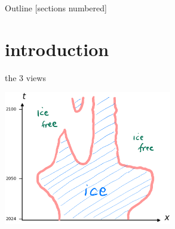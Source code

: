 \documentclass[10pt,dvipsnames]{beamer}
\begin{document}
\begin{frame}{Outline}
  [sections numbered]
  \tableofcontents[hideallsubsections]
\end{frame}

\AtBeginSection[]
{%
}

\section{introduction}

\begin{frame}{the 3 views}

\vspace{-2mm}
\begin{center}
\includegraphics[width=0.55\textwidth]{xtcrop}
\end{center}


\end{frame}
\end{document}
